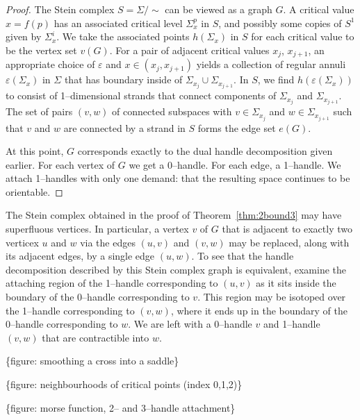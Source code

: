 \begin{proof}
	The Stein complex $S=\Sigma/\!\!\sim$ can be viewed as a graph $G$.
	A critical value $x=f(p)$ has an associated critical level $\Sigma_x^p$ in $S$, and possibly some copies of $S^1$ given by $\Sigma_x^i$.
	We take the associated points $h(\Sigma_x)$ in $S$ for each critical value to be the vertex set $v(G)$.
	For a pair of adjacent critical values $x_{j}$, $x_{j+1}$, an appropriate choice of $\varepsilon$ and $x\in(x_{j},x_{j+1})$ yields a collection of regular annuli $\varepsilon(\Sigma_x)$ in $\Sigma$ that has boundary inside of $\Sigma_{x_{j}}\cup\Sigma_{x_{j+1}}$.
	In $S$, we find $h(\varepsilon(\Sigma_x))$ to consist of 1--dimensional strands that connect components of $\Sigma_{x_{j}}$ and $\Sigma_{x_{j+1}}$.
	The set of pairs $(v,w)$ of connected subspaces with $v\in\Sigma_{x_{j}}$ and $w\in\Sigma_{x_{j+1}}$ such that $v$ and $w$ are connected by a strand in $S$ forms the edge set $e(G)$.
	
	At this point, $G$ corresponds exactly to the dual handle decomposition given earlier.
	For each vertex of $G$ we get a 0--handle.
	For each edge, a 1--handle.
	We attach 1--handles with only one demand: that the resulting space continues to be orientable.
\end{proof}

The Stein complex obtained in the proof of Theorem~\ref{thm:2bound3} may have superfluous vertices.
In particular, a vertex $v$ of $G$ that is adjacent to exactly two verticex $u$ and $w$ via the edges $(u,v)$ and $(v,w)$ may be replaced, along with its adjacent edges, by a single edge $(u,w)$.
To see that the handle decomposition described by this Stein complex graph is equivalent, examine the attaching region of the 1--handle corresponding to $(u,v)$ as it sits inside the boundary of the 0--handle corresponding to $v$.
This region may be isotoped over the 1--handle corresponding to $(v,w)$, where it ends up in the boundary of the 0--handle corresponding to $w$.
We are left with a 0--handle $v$ and 1--handle $(v,w)$ that are contractible into $w$.

\{figure: smoothing a cross into a saddle\}

\{figure: neighbourhoods of critical points (index 0,1,2)\}

\{figure: morse function, 2-- and 3--handle attachment\}
